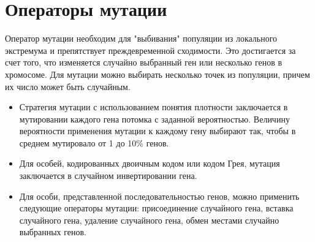 \section{Операторы мутации}
Оператор мутации необходим для "выбивания" популяции из локального экстремума и препятствует преждевременной сходимости. Это достигается за счет того, что изменяется случайно выбранный ген или несколько генов в хромосоме. Для мутации можно выбирать несколько точек из популяции, причем их число может быть случайным.
\begin{itemize}[label=$\ast$]
	\item {}

Стратегия мутации с использованием понятия плотности заключается в мутировании каждого гена потомка с заданной вероятностью. Величину вероятности применения мутации к каждому гену выбирают так, чтобы в среднем мутировало от 1 до 10\% генов.
	\item {}

Для особей, кодированных двоичным кодом или кодом Грея, мутация заключается в случайном инвертировании гена.
	\item {}

Для особи, представленной последовательностью генов, можно применить следующие операторы мутации: присоединение случайного гена, вставка случайного гена, удаление случайного гена, обмен местами случайно выбранных генов.
\end{itemize}

